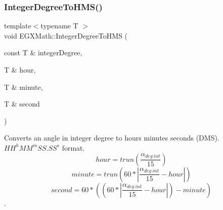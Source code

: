 \subsubsection{\texorpdfstring{Integer\+Degree\+To\+H\+M\+S()}{IntegerDegreeToHMS()}}
{\footnotesize\ttfamily template$<$typename T $>$ \\
void E\+G\+X\+Math\+::\+Integer\+Degree\+To\+H\+MS (\begin{DoxyParamCaption}\item[{const T \&}]{integer\+Degree,  }\item[{T \&}]{hour,  }\item[{T \&}]{minute,  }\item[{T \&}]{second }\end{DoxyParamCaption})}



Converts an angle in integer degree to hours minutes seconds (D\+MS). ${HH}^{h}{MM}^{m}{SS.SS}^{s}$ format. \[hour=trun(\frac{\alpha_{deg\ int}}{15})\] \[minute=trun(60 * |\frac{\alpha_{deg\ int}}{15} - hour|)\] \[second=60 * ((60 * |\frac{\alpha_{deg\ int}}{15} - hour|)-minute)\]. 

